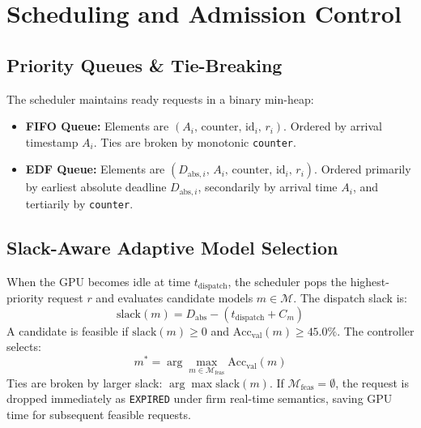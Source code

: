\documentclass[conference]{IEEEtran}
\begin{document}
\section{Scheduling and Admission Control}

\subsection{Priority Queues \& Tie-Breaking}
The scheduler maintains ready requests in a binary min-heap:
\begin{itemize}
    \item \textbf{FIFO Queue:} Elements are $(A_i, \, \text{counter}, \, \text{id}_i, \, r_i)$. Ordered by arrival timestamp $A_i$. Ties are broken by monotonic \texttt{counter}.
    \item \textbf{EDF Queue:} Elements are $(D_{\text{abs}, i}, \, A_i, \, \text{counter}, \, \text{id}_i, \, r_i)$. Ordered primarily by earliest absolute deadline $D_{\text{abs}, i}$, secondarily by arrival time $A_i$, and tertiarily by \texttt{counter}.
\end{itemize}

\subsection{Slack-Aware Adaptive Model Selection}
When the GPU becomes idle at time $t_{\text{dispatch}}$, the scheduler pops the highest-priority request $r$ and evaluates candidate models $m \in \mathcal{M}$. The dispatch slack is:
\begin{equation}
\text{slack}(m) = D_{\text{abs}} - (t_{\text{dispatch}} + C_m)
\end{equation}
A candidate is feasible if $\text{slack}(m) \ge 0$ and $\text{Acc}_{\text{val}}(m) \ge 45.0\%$. The controller selects:
\begin{equation}
m^* = \arg\max_{m \in \mathcal{M}_{\text{feas}}} \text{Acc}_{\text{val}}(m)
\end{equation}
Ties are broken by larger slack: $\arg\max \text{slack}(m)$. If $\mathcal{M}_{\text{feas}} = \emptyset$, the request is dropped immediately as \texttt{EXPIRED} under firm real-time semantics, saving GPU time for subsequent feasible requests.
\end{document}
